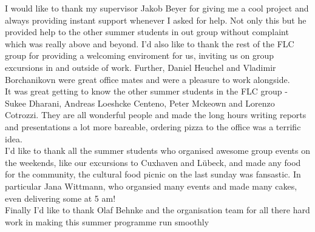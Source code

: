 I would like to thank my supervisor Jakob Beyer for giving me a cool project and always providing instant support whenever I asked for help. Not only this but he provided help to the other summer students in out group without complaint which was really above and beyond. I'd also like to thank the rest of the FLC group for providing a welcoming enviroment for us, inviting us on group excursions in and outside of work. Further, Daniel Heuchel and Vladimir Borchanikovn were great office mates and were a pleasure to work alongside.
\\
It was great getting to know the other summer students in the FLC group - Sukee Dharani, Andreas Loeshcke Centeno, Peter Mckeown and Lorenzo Cotrozzi. They are all wonderful people and made the long hours writing reports and presentations a lot more bareable, ordering pizza to the office was a terrific idea.
\\
I'd like to thank all the summer students who organised awesome group events on the weekends, like our excursions to Cuxhaven and L\"ubeck, and made any food for the community, the cultural food picnic on the last sunday was fansastic. In particular Jana Wittmann, who organsied many events and made many cakes, even delivering some at 5 am!
\\
Finally I'd like to thank Olaf Behnke and the organisation team for all there hard work in making this summer programme run smoothly
